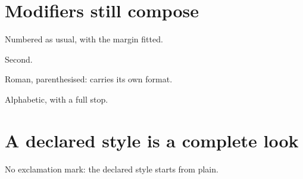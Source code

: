 \documentclass{article}
\begin{document}
\section{Modifiers still compose}

\begin{prop}[style=fitmargin]
  \item Numbered as usual, with the margin fitted.
  \item Second.
\end{prop}

\begin{prop}
  \item[style=roman] Roman, parenthesised: carries its own format.
  \item[style=alph] Alphabetic, with a full stop.
\end{prop}

\section{A declared style is a complete look}

\begin{prop}[label format = {#1!}]
  \item[style=mydecl] No exclamation mark: the declared style starts from plain.
\end{prop}
\end{document}
